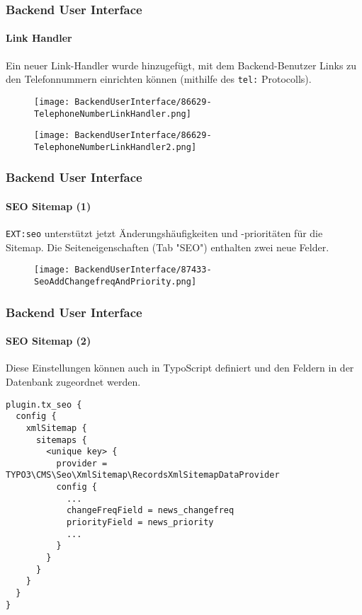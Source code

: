 
\begin{frame}[fragile]
	\frametitle{Backend User Interface}
	\framesubtitle{Link Handler}

	Ein neuer Link-Handler wurde hinzugefügt, mit dem Backend-Benutzer Links zu den Telefonnummern einrichten können
     (mithilfe des \texttt{tel:} Protocolls).

	\begin{figure}
		\texttt{[image: BackendUserInterface/86629-TelephoneNumberLinkHandler.png]}
	\end{figure}

	\begin{figure}
		\texttt{[image: BackendUserInterface/86629-TelephoneNumberLinkHandler2.png]}
	\end{figure}

\end{frame}


\begin{frame}[fragile]
	\frametitle{Backend User Interface}
	\framesubtitle{SEO Sitemap (1)}

	\texttt{EXT:seo} unterstützt jetzt Änderungshäufigkeiten und -prioritäten für die Sitemap.
	Die Seiteneigenschaften (Tab "SEO") enthalten zwei neue Felder.

	\begin{figure}
		\texttt{[image: BackendUserInterface/87433-SeoAddChangefreqAndPriority.png]}
	\end{figure}

\end{frame}


\begin{frame}[fragile]
	\frametitle{Backend User Interface}
	\framesubtitle{SEO Sitemap (2)}

	\lstset{basicstyle=\tiny\ttfamily}

	Diese Einstellungen können auch in TypoScript definiert und den Feldern in der Datenbank zugeordnet werden.
	
	\begin{lstlisting}
plugin.tx_seo {
  config {
    xmlSitemap {
      sitemaps {
        <unique key> {
          provider = TYPO3\CMS\Seo\XmlSitemap\RecordsXmlSitemapDataProvider
          config {
            ...
            changeFreqField = news_changefreq
            priorityField = news_priority
            ...
          }
        }
      }
    }
  }
}
	\end{lstlisting}

\end{frame}

